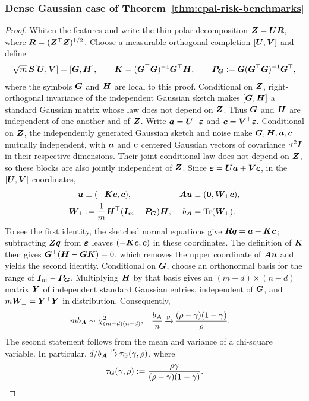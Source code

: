 \documentclass{article}
\theoremstyle{plain} %
\theoremstyle{definition} %
\theoremstyle{definition} %
\begin{document}
\subsubsection{Dense Gaussian case of Theorem~\ref{thm:cpal-risk-benchmarks}}
\label{app:dense-Gaussian-proof}

\begin{proof}
Whiten the features and write the thin polar decomposition
$\boldsymbol{Z}=\boldsymbol{U}\boldsymbol{R}$, where $\boldsymbol{R}=(\boldsymbol{Z}^\top\boldsymbol{Z})^{1/2}$.
Choose a measurable orthogonal completion $[\boldsymbol{U},\boldsymbol{V}]$ and define
\begin{align*}
    \sqrt m\,\boldsymbol{S}[\boldsymbol{U},\boldsymbol{V}]=[\boldsymbol{G},\boldsymbol{H}],
    \qquad
    \boldsymbol{K}=(\boldsymbol{G}^\top\boldsymbol{G})^{-1}\boldsymbol{G}^\top\boldsymbol{H},
    \qquad
    \boldsymbol{P}_{\boldsymbol{G}}:=\boldsymbol{G}(\boldsymbol{G}^\top\boldsymbol{G})^{-1}\boldsymbol{G}^\top,
\end{align*}
where the symbols $\boldsymbol{G}$ and $\boldsymbol{H}$ are local to this proof. Conditional
on $\boldsymbol{Z}$, right-orthogonal invariance of the independent Gaussian
sketch makes $[\boldsymbol{G},\boldsymbol{H}]$ a standard Gaussian matrix whose law does not
depend on $\boldsymbol{Z}$. Thus $\boldsymbol{G}$ and $\boldsymbol{H}$ are independent of one another
and of $\boldsymbol{Z}$.      Write $\boldsymbol{a}=\boldsymbol{U}^\top{\boldsymbol{\varepsilon} }$ and $\boldsymbol{c}=\boldsymbol{V}^\top{\boldsymbol{\varepsilon} }$.
Conditional on $\boldsymbol{Z}$, the independently generated Gaussian sketch and noise
make $\boldsymbol{G},\boldsymbol{H},\boldsymbol{a},\boldsymbol{c}$ mutually independent, with $\boldsymbol{a}$ and $\boldsymbol{c}$ centered
Gaussian vectors of covariance $\sigma^2\boldsymbol{I}$ in their respective dimensions.
Their joint conditional law does not depend on $\boldsymbol{Z}$, so these blocks are
also jointly independent of $\boldsymbol{Z}$. Since ${\boldsymbol{\varepsilon} }=\boldsymbol{U}\boldsymbol{a}+\boldsymbol{V}\boldsymbol{c}$, in the
$[\boldsymbol{U},\boldsymbol{V}]$ coordinates, 
\begin{align}
    \boldsymbol{u}&\equiv(-\boldsymbol{K}\boldsymbol{c},\boldsymbol{c}),
    &
    \boldsymbol{A}\boldsymbol{u}&\equiv(\mathbf{0},\boldsymbol{W}_{\perp}\boldsymbol{c}),
    \label{eq:Gaussian-coordinate-decomp}\\
    \boldsymbol{W}_{\perp}&:=\frac{1}{m}\boldsymbol{H}^\top(\boldsymbol{I}_m-\boldsymbol{P}_{\boldsymbol{G}})\boldsymbol{H},
    & b_{\boldsymbol{A}}&=\operatorname{Tr}(\boldsymbol{W}_{\perp}).
    \notag
\end{align}
To see the first identity, the sketched normal equations give
$\boldsymbol{R}\boldsymbol{q}=\boldsymbol{a}+\boldsymbol{K}\boldsymbol{c}$; subtracting $\boldsymbol{Z}\boldsymbol{q}$ from
${\boldsymbol{\varepsilon} }$ leaves $(-\boldsymbol{K}\boldsymbol{c},\boldsymbol{c})$ in these coordinates.
The definition of $\boldsymbol{K}$ then gives
$\boldsymbol{G}^\top(\boldsymbol{H}-\boldsymbol{G}\boldsymbol{K})=0$, which removes the upper coordinate of
$\boldsymbol{A}\boldsymbol{u}$ and yields the second identity.
Conditional on $\boldsymbol{G}$, choose an orthonormal basis for the range of
$\boldsymbol{I}_m-\boldsymbol{P}_{\boldsymbol{G}}$. Multiplying $\boldsymbol{H}$ by that basis gives an
$(m-d)\times(n-d)$ matrix $\boldsymbol{Y}$ of independent standard Gaussian entries,
independent of $\boldsymbol{G}$, and $m\boldsymbol{W}_\perp=\boldsymbol{Y}^\top\boldsymbol{Y}$ in distribution.
Consequently,
\begin{align}
    mb_{\boldsymbol{A}}&\sim\chi^2_{(m-d)(n-d)},
    &
    \frac{b_{\boldsymbol{A}}}n
    &{\,\smash{\xrightarrow{\mathrm{p}}}}\,\frac{(\rho-\gamma)(1-\gamma)}{\rho}.
    \label{eq:Gaussian-W-traces}
\end{align}
The second statement follows from the mean and variance of a chi-square
variable. In particular,
$d/b_{\boldsymbol{A}}{\,\smash{\xrightarrow{\mathrm{p}}}}\,\tau_{\rm G}(\gamma,\rho)$, where
\begin{align*}
    \tau_{\rm G}(\gamma,\rho)
    :=\frac{\rho\gamma}{(\rho-\gamma)(1-\gamma)}.
\end{align*}


\end{proof}
\end{document}
